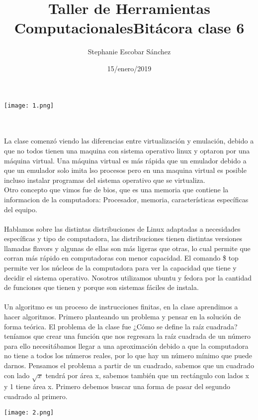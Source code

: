 \documentclass{article}
\title{\Huge Taller de Herramientas Computacionales}
\author{Stephanie Escobar Sánchez}
\date{15/enero/2019}
\begin{document}
	\maketitle
\begin{center}
	\texttt{[image: 1.png]}	
\end{center}
\newpage
\title{\Huge Bitácora clase 6} \\
\\
La clase comenzó viendo las diferencias entre virtualización y emulación, debido a que no todos tienen una maquina con sistema operativo linux y optaron por una máquina virtual. Una máquina virtual es más rápida que un emulador debido a que un emulador solo imita lso procesos pero en una maquina virtual es posible incluso instalar programas del sistema operativo que se virtualiza.\\
Otro concepto que vimos fue de bios, que es una memoria que contiene la informacion de la computadora: Procesador, memoria, características específicas del equipo.\\
\\
Hablamos sobre las distintas distribuciones de Linux adaptadas a necesidades específicas y tipo de computadora, las distribuciones tienen distintas versiones llamadas flavors y algunas de ellas son más ligeras que otras, lo cual permite que corran más rápido en computadoras con menor capacidad. El comando \$ top permite ver los núcleos de la computadora para ver la capacidad que tiene y decidir el sistema operativo. Nosotros utilizamos ubuntu y fedora por la cantidad de funciones que tienen y porque son sistemas fáciles de instala.\\
\\
Un algoritmo es un proceso de instrucciones finitas, en la clase aprendimos a hacer algoritmos. Primero planteando un problema y pensar en la solución de forma teórica. El problema de la clase fue ¿Cómo se define la raíz cuadrada? teníamos que crear una función que nos regresara la raíz cuadrada de un número para ello necesitábamos llegar a una aproximación debido a que la computadora no tiene a todos los números reales, por lo que hay un número mínimo que puede darnos.
Pensamos el problema a partir de un cuadrado, sabemos que un cuadrado con lado $\sqrt{x}$ tendrá por área x, sabemos también que un rectángulo con lados x y 1 tiene área x. Primero debemos buscar una forma de pasar del segundo cuadrado al primero.
\begin{center}
	\texttt{[image: 2.png]}	
\end{center}
\end{document}
